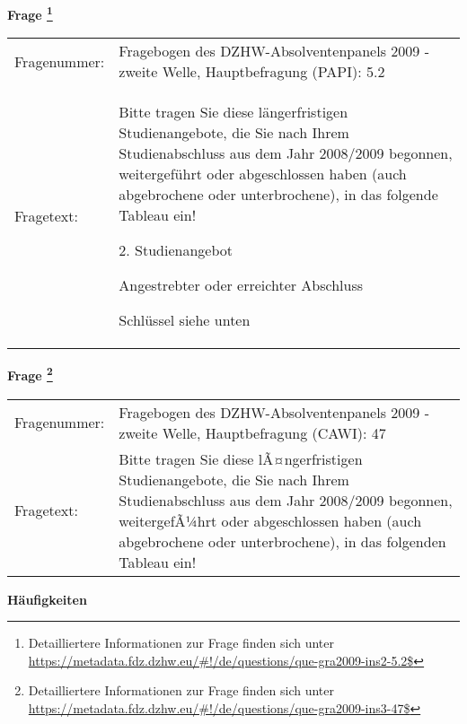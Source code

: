 				\vspace*{0.5cm}
                \noindent\textbf{Frage
	                \footnote{Detailliertere Informationen zur Frage finden sich unter
		              \url{https://metadata.fdz.dzhw.eu/\#!/de/questions/que-gra2009-ins2-5.2$}}}\\
				\begin{tabularx}{\hsize}{@{}lX}
					Fragenummer: &
					  Fragebogen des DZHW-Absolventenpanels 2009 - zweite Welle, Hauptbefragung (PAPI):
					  5.2
 \\
					Fragetext: & Bitte tragen Sie diese längerfristigen Studienangebote, die Sie nach Ihrem Studienabschluss aus dem Jahr 2008/2009 begonnen, weitergeführt oder abgeschlossen haben (auch abgebrochene oder unterbrochene), in das folgende Tableau ein!\par  2. Studienangebot\par  Angestrebter oder erreichter Abschluss\par  Schlüssel siehe unten \\
				\end{tabularx}
				\vspace*{0.5cm}
                \noindent\textbf{Frage
	                \footnote{Detailliertere Informationen zur Frage finden sich unter
		              \url{https://metadata.fdz.dzhw.eu/\#!/de/questions/que-gra2009-ins3-47$}}}\\
				\begin{tabularx}{\hsize}{@{}lX}
					Fragenummer: &
					  Fragebogen des DZHW-Absolventenpanels 2009 - zweite Welle, Hauptbefragung (CAWI):
					  47
 \\
					Fragetext: & Bitte tragen Sie diese lÃ¤ngerfristigen Studienangebote, die Sie nach Ihrem Studienabschluss aus dem Jahr 2008/2009 begonnen, weitergefÃ¼hrt oder abgeschlossen haben (auch abgebrochene oder unterbrochene), in das folgenden Tableau ein! \\
				\end{tabularx}





        		\vspace*{0.5cm}
                \noindent\textbf{Häufigkeiten}

